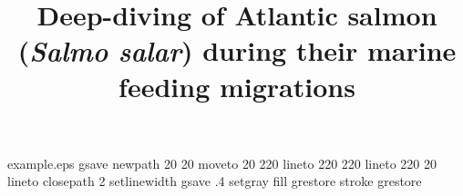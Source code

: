 %
%
%
%
%
\begin{filecontents*}{example.eps}
gsave
newpath
  20 20 moveto
  20 220 lineto
  220 220 lineto
  220 20 lineto
closepath
2 setlinewidth
gsave
  .4 setgray fill
grestore
stroke
grestore
\end{filecontents*}
%
\RequirePackage{fix-cm}
%
\documentclass[smallextended,referee]{svjour3}       %
%
\smartqed  %
%
\usepackage{graphicx}
%
%
\usepackage{natbib}
\usepackage{multirow}
\usepackage{float}
\usepackage[utf8]{inputenc}
\usepackage[T1, OT1]{fontenc}
%
%
%


\title{Deep-diving of Atlantic salmon (\textit{Salmo salar})  during their marine feeding migrations%
}

